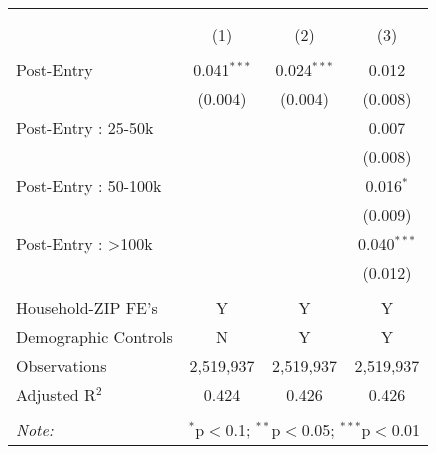 
\begin{table}[!htbp] \centering 
  \caption{} 
  \label{} 
\begin{tabular}{@{\extracolsep{5pt}}lccc} 
\\[-1.8ex]\hline 
\hline \\[-1.8ex] 
\\[-1.8ex] & (1) & (2) & (3)\\ 
\hline \\[-1.8ex] 
 Post-Entry & 0.041$^{***}$ & 0.024$^{***}$ & 0.012 \\ 
  & (0.004) & (0.004) & (0.008) \\ 
  Post-Entry : 25-50k &  &  & 0.007 \\ 
  &  &  & (0.008) \\ 
  Post-Entry : 50-100k &  &  & 0.016$^{*}$ \\ 
  &  &  & (0.009) \\ 
  Post-Entry : >100k &  &  & 0.040$^{***}$ \\ 
  &  &  & (0.012) \\ 
 \hline \\[-1.8ex] 
Household-ZIP FE's & Y & Y & Y \\ 
Demographic Controls & N & Y & Y \\ 
Observations & 2,519,937 & 2,519,937 & 2,519,937 \\ 
Adjusted R$^{2}$ & 0.424 & 0.426 & 0.426 \\ 
\hline 
\hline \\[-1.8ex] 
\textit{Note:}  & \multicolumn{3}{l}{$^{*}$p$<$0.1; $^{**}$p$<$0.05; $^{***}$p$<$0.01} \\ 
\end{tabular} 
\end{table} 
